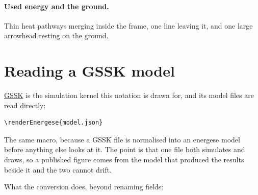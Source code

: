 \documentclass{article}
\begin{document}
\paragraph{Used energy and the ground.} Thin heat pathways merging inside the
frame, one line leaving it, and one large arrowhead resting on the ground.


\section{Reading a GSSK model}

\href{https://github.com/energese-project/GSSK}{GSSK} is the simulation kernel this
notation is drawn for, and its model files are read directly:

\begin{verbatim}
\renderEnergese{model.json}
\end{verbatim}

\noindent The same macro, because a GSSK file is normalised into an energese
model before anything else looks at it. The point is that one file both
simulates and draws, so a published figure comes from the model that produced
the results beside it and the two cannot drift.

What the conversion does, beyond renaming fields:
\end{document}
